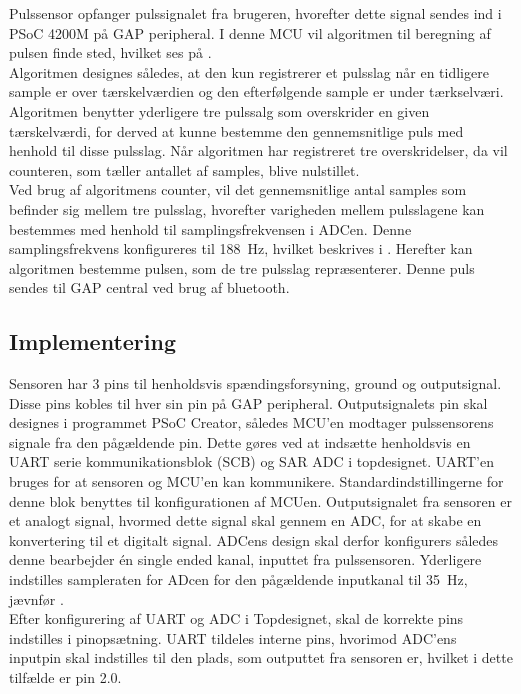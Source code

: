 Pulssensor opfanger pulssignalet fra brugeren, hvorefter dette signal sendes ind i PSoC 4200M på GAP peripheral. I denne MCU vil algoritmen til beregning af pulsen finde sted, hvilket ses på . \\
Algoritmen designes således, at den kun registrerer et pulsslag når en tidligere sample er over tærskelværdien og den efterfølgende sample er under tærkselværi. Algoritmen benytter yderligere tre pulssalg som overskrider en given tærskelværdi, for derved at kunne bestemme den gennemsnitlige puls med henhold til disse pulsslag. Når algoritmen har registreret tre overskridelser, da vil counteren, som tæller antallet af samples, blive nulstillet. \\
Ved brug af algoritmens counter, vil det gennemsnitlige antal samples som befinder sig mellem tre pulsslag, hvorefter varigheden mellem pulsslagene kan bestemmes med henhold til samplingsfrekvensen i ADCen. Denne samplingsfrekvens konfigureres til 188~Hz, hvilket beskrives i . Herefter kan algoritmen bestemme pulsen, som de tre pulsslag repræsenterer. Denne puls sendes til GAP central ved brug af bluetooth. 


\subsection{Implementering}
Sensoren har 3 pins til henholdsvis spændingsforsyning, ground og outputsignal. Disse pins kobles til hver sin pin på GAP peripheral. Outputsignalets pin skal designes i programmet PSoC Creator, således MCU'en modtager pulssensorens signale fra den pågældende pin. Dette gøres ved at indsætte henholdsvis en UART serie kommunikationsblok (SCB) og SAR ADC i topdesignet. UART'en bruges for at sensoren og MCU'en kan kommunikere. Standardindstillingerne for denne blok benyttes til konfigurationen af MCUen. \newline
Outputsignalet fra sensoren er et analogt signal, hvormed dette signal skal gennem en ADC, for at skabe en konvertering til et digitalt signal. ADCens design skal derfor konfigurers således denne bearbejder én single ended kanal, inputtet fra pulssensoren. Yderligere indstilles sampleraten for ADcen for den pågældende inputkanal til 35~Hz, jævnfør . \\
Efter konfigurering af UART og ADC i Topdesignet, skal de korrekte pins indstilles i pinopsætning. UART tildeles interne pins, hvorimod ADC'ens inputpin skal indstilles til den plads, som outputtet fra sensoren er, hvilket i dette tilfælde er pin 2.0. 

